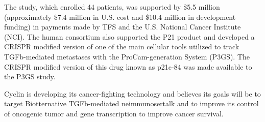 \documentclass{article}
\begin{document}
The study, which enrolled 44 patients, was supported by \$5.5 million (approximately \$7.4 million in U.S. cost and \$10.4 million in development funding) in payments made by TFS and the U.S. National Cancer Institute (NCI). The human consortium also supported the P21 product and developed a CRISPR modified version of one of the main cellular tools utilized to track TGFb-mediated metastases with the ProCam-generation System (P3GS). The CRISPR modified version of this drug known as p21c-84 was made available to the P3GS study.

Cyclin is developing its cancer-fighting technology and believes its goals will be to target Biotternative TGFb-mediated neimmunosertalk and to improve its control of oncogenic tumor and gene transcription to improve cancer survival.
\end{document}
